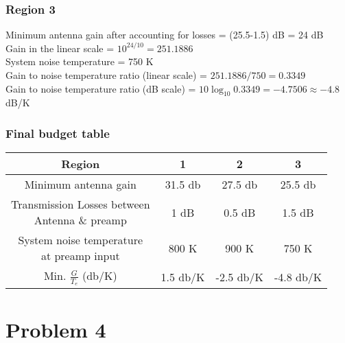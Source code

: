 \documentclass[titlepage]{article}
\begin{document}
\subsubsection*{Region 3}
Minimum antenna gain after accounting for losses = (25.5-1.5) dB = 24 dB \\
Gain in the linear scale = $10^{24/10} = 251.1886$ \\
System noise temperature = 750 K \\
Gain to noise temperature ratio (linear scale) = $251.1886/750 = 0.3349$ \\
Gain to noise temperature ratio (dB scale) = $10\log_{10} 0.3349 = -4.7506 \approx -4.8$ dB/K
\subsubsection{Final budget table}
\begin{center}
    \begin{tabular}{||c | c | c | c||}
        \hline
        Region                      & 1        & 2         & 3         \\[0.5ex]
        \hline\hline
        Minimum antenna gain        & 31.5 db  & 27.5 db   & 25.5 db   \\[0.5ex]
        \hline
        \makecell{Transmission Losses between                          \\ Antenna \& preamp} & 1 dB & 0.5 dB & 1.5 dB \\[0.5ex]
        \hline
        \makecell{System noise temperature                             \\ at preamp input} & 800 K & 900 K & 750 K \\[0.5ex]
        \hline
        Min. $\frac{G}{T_e}$ (db/K) & 1.5 db/K & -2.5 db/K & -4.8 db/K \\[0.5ex]
        \hline
    \end{tabular}
\end{center}

\newpage

\section {Problem 4}
\end{document}

